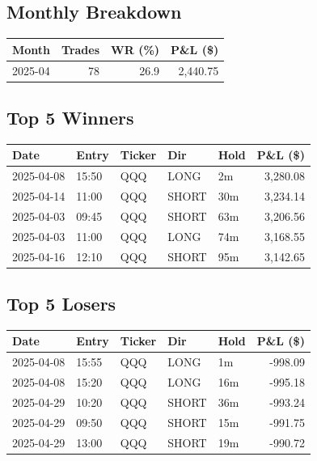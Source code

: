 \documentclass[11pt,a4paper,twoside]{article}
\begin{document}
\subsection{Monthly Breakdown}
\noindent\begin{center}
\begin{tabular}{>{\color{txtmain}}l rrr}
\toprule
\rowcolor{cardbg}
\textbf{Month} & \textbf{Trades} & \textbf{WR (\%)} & \textbf{P\&L (\$)} \\
\midrule
2025-04 & 78 & 26.9 & \textcolor{wingreen}{2,440.75} \\
\bottomrule
\end{tabular}
\end{center}
\subsection{Top 5 Winners}
\noindent\begin{center}
\begin{tabular}{>{\color{txtmain}}l llll r}
\toprule
\rowcolor{cardbg}
\textbf{Date} & \textbf{Entry} & \textbf{Ticker} & \textbf{Dir} & \textbf{Hold} & \textbf{P\&L (\$)} \\
\midrule
2025-04-08 & 15:50 & QQQ & LONG & 2m & \textcolor{wingreen}{3,280.08} \\
2025-04-14 & 11:00 & QQQ & SHORT & 30m & \textcolor{wingreen}{3,234.14} \\
2025-04-03 & 09:45 & QQQ & SHORT & 63m & \textcolor{wingreen}{3,206.56} \\
2025-04-03 & 11:00 & QQQ & LONG & 74m & \textcolor{wingreen}{3,168.55} \\
2025-04-16 & 12:10 & QQQ & SHORT & 95m & \textcolor{wingreen}{3,142.65} \\
\bottomrule
\end{tabular}
\end{center}
\subsection{Top 5 Losers}
\noindent\begin{center}
\begin{tabular}{>{\color{txtmain}}l llll r}
\toprule
\rowcolor{cardbg}
\textbf{Date} & \textbf{Entry} & \textbf{Ticker} & \textbf{Dir} & \textbf{Hold} & \textbf{P\&L (\$)} \\
\midrule
2025-04-08 & 15:55 & QQQ & LONG & 1m & \textcolor{lossred}{-998.09} \\
2025-04-08 & 15:20 & QQQ & LONG & 16m & \textcolor{lossred}{-995.18} \\
2025-04-29 & 10:20 & QQQ & SHORT & 36m & \textcolor{lossred}{-993.24} \\
2025-04-29 & 09:50 & QQQ & SHORT & 15m & \textcolor{lossred}{-991.75} \\
2025-04-29 & 13:00 & QQQ & SHORT & 19m & \textcolor{lossred}{-990.72} \\
\bottomrule
\end{tabular}
\end{center}
\clearpage
\end{document}
